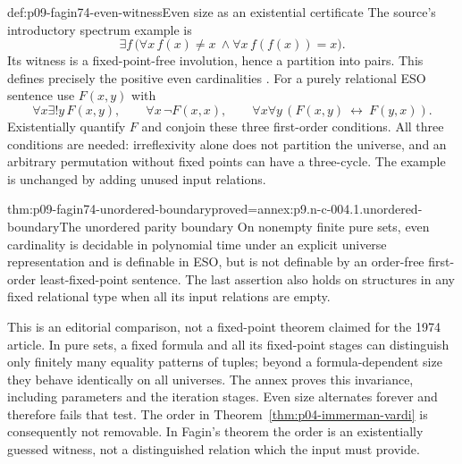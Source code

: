 \begin{hbexample}{def:p09-fagin74-even-witness}{Even size as an existential certificate}
The source's introductory spectrum example is
\[
 \exists f\,\bigl(\forall x\,f(x)\ne x\ \land
                  \forall x\,f(f(x))=x\bigr).
\]
Its witness is a fixed-point-free involution, hence a partition into pairs.
This defines precisely the positive even cardinalities
\cite[pp.~43--44]{Fagin1974}.  For a purely relational ESO sentence use
\(F(x,y)\) with
\[
 \forall x\exists!y\,F(x,y),\qquad
 \forall x\,\neg F(x,x),\qquad
 \forall x\forall y\,(F(x,y)\ \longleftrightarrow\ F(y,x)).
\]
Existentially quantify \(F\) and conjoin these three first-order conditions.
All three conditions are needed: irreflexivity alone does not partition the
universe, and an arbitrary permutation without fixed points can have a
three-cycle.  The example is unchanged by adding unused input relations.
\end{hbexample}

\begin{hblemma}{thm:p09-fagin74-unordered-boundary}{proved=annex:p9.n-c-004.1.unordered-boundary}{The unordered parity boundary}
On nonempty finite pure sets, even cardinality is decidable in polynomial time
under an explicit universe representation and is definable in ESO, but is not
definable by an order-free first-order least-fixed-point sentence.
The last assertion also holds on structures in any fixed relational type when
all its input relations are empty.
\end{hblemma}

This is an editorial comparison, not a fixed-point theorem claimed for the
1974 article.  In pure sets, a fixed formula and all its fixed-point stages
can distinguish only finitely many equality patterns of tuples; beyond a
formula-dependent size they behave identically on all universes.
The annex proves this invariance, including parameters and the iteration
stages.  Even size alternates forever and therefore fails that test.
The order in Theorem~\ref{thm:p04-immerman-vardi} is consequently not
removable.  In Fagin's theorem the order is an existentially guessed witness,
not a distinguished relation which the input must provide.

